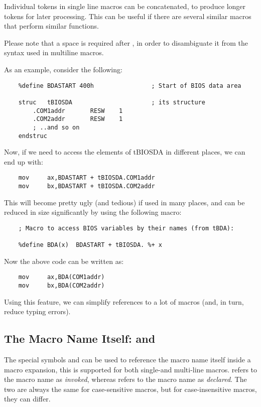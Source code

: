 Individual tokens in single line macros can be concatenated, to produce
longer tokens for later processing. This can be useful if there are
several similar macros that perform similar functions.

Please note that a space is required after \code{\%+}, in order to
disambiguate it from the syntax  used in multiline macros.

As an example, consider the following:

\begin{lstlisting}
	%define BDASTART 400h                ; Start of BIOS data area

	struc   tBIOSDA                      ; its structure
		.COM1addr       RESW    1
		.COM2addr       RESW    1
		; ..and so on
	endstruc
\end{lstlisting}

Now, if we need to access the elements of tBIOSDA in different places,
we can end up with:

\begin{lstlisting}
	mov     ax,BDASTART + tBIOSDA.COM1addr
	mov     bx,BDASTART + tBIOSDA.COM2addr
\end{lstlisting}

This will become pretty ugly (and tedious) if used in many places, and
can be reduced in size significantly by using the following macro:

\begin{lstlisting}
	; Macro to access BIOS variables by their names (from tBDA):

	%define BDA(x)  BDASTART + tBIOSDA. %+ x
\end{lstlisting}

Now the above code can be written as:

\begin{lstlisting}
	mov     ax,BDA(COM1addr)
	mov     bx,BDA(COM2addr)
\end{lstlisting}

Using this feature, we can simplify references to a lot of macros
(and, in turn, reduce typing errors).

\subsection{The Macro Name Itself:  and }
\label{subsec:selfref}

The special symbols  and  can be used to
reference the macro name itself inside a macro expansion,
this is supported for both single-and multi-line macros.
 refers to the macro name as \emph{invoked}, whereas
 refers to the macro name as \emph{declared}.
The two are always the same for case-sensitive macros, but
for case-insensitive macros, they can differ.

